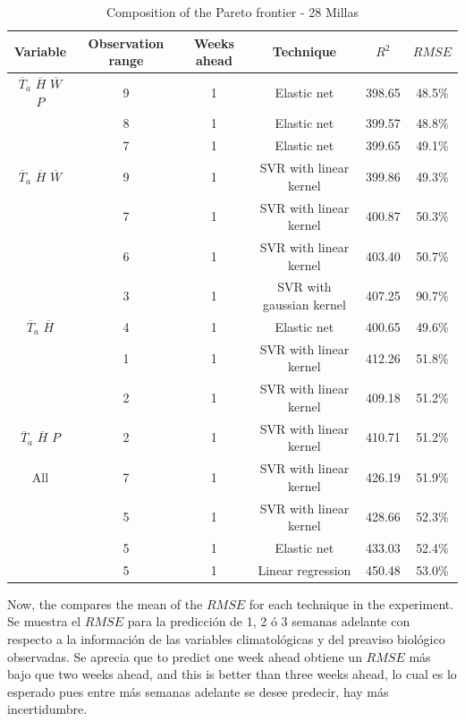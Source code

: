 \begin{table}[h] 
\caption{Composition of the Pareto frontier - 28 Millas} 
\label{tabla4} 
\centering
\begin{tabular}{c|c|c|c|c|c} 
\hline
\bfseries Variable & \bfseries Observation range & \bfseries Weeks ahead & \bfseries Technique &\bfseries $R^2$ & \bfseries $RMSE$\\ 
\hline\hline 
$\overline{T}_{a}$ $\overline{H}$ $\overline{W}$ $P$  &	9  & 1  & Elastic net & 398.65 & 48.5\% \\
													&	8  & 1 & Elastic net & 399.57 & 48.8\% \\
													&	7  & 1 & Elastic net & 399.65 & 49.1\% \\													
\hline 													
$\overline{T}_{a}$ $\overline{H}$ $\overline{W}$  &	9  & 1  & SVR with linear kernel & 399.86 & 49.3\% \\
												&	7  & 1  & SVR with linear kernel & 400.87 & 50.3\% \\
												&	6  & 1  & SVR with linear kernel & 403.40 & 50.7\% \\
												&	3  & 1  & SVR with gaussian kernel & 407.25 & 90.7\% \\													
\hline 													
$\overline{T}_{a}$ $\overline{H}$  &	4  & 1  & Elastic net & 400.65 & 49.6\% \\
									&	1  & 1  & SVR with linear kernel & 412.26 & 51.8\% \\
									&	2  & 1  & SVR with linear kernel & 409.18 & 51.2\% \\			
\hline 																												
$\overline{T}_{a}$ $\overline{H}$ $P$  & 2  & 1  & SVR with linear kernel & 410.71 & 51.2\% \\
\hline 																												
All  & 7  & 1  & SVR with linear kernel & 426.19 & 51.9\% \\
     & 5  & 1  & SVR with linear kernel & 428.66 & 52.3\% \\
     & 5 & 1  & Elastic net & 433.03 & 52.4\% \\
     &  5 & 1  & Linear regression & 450.48 & 53.0\% \\          
\hline	
\end{tabular} 
\end{table}
%
Now, the  compares the mean of the $RMSE$ for each technique in the experiment. Se muestra el $RMSE$ para la predicción de 1, 2 ó 3 semanas adelante con respecto a la información de las variables climatológicas y del preaviso biológico observadas. Se aprecia que to predict one week ahead obtiene un $RMSE$ más bajo que two weeks ahead, and this is better than three weeks ahead, lo cual es lo esperado pues entre más semanas adelante se desee predecir, hay más incertidumbre.
